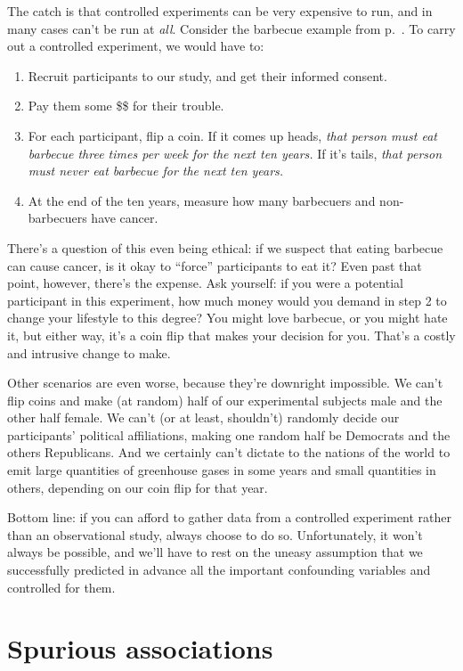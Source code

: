 The catch is that controlled experiments can be very expensive to run, and in
many cases can't be run at \textit{all}. Consider the barbecue example from
p.~\pageref{barbecue}. To carry out a controlled experiment, we would have to:

\begin{enumerate}[nosep]
\item Recruit participants to our study, and get their informed consent.
\item Pay them some \$\$ for their trouble.
\item For each participant, flip a coin. If it comes up heads, \textit{that
person must eat barbecue three times per week for the next ten years.} If it's
tails, \textit{that person must never eat barbecue for the next ten years.}
\item At the end of the ten years, measure how many barbecuers and
non-barbecuers have cancer.
\end{enumerate}

There's a question of this even being ethical: if we suspect that eating
barbecue can cause cancer, is it okay to ``force'' participants to eat it? Even
past that point, however, there's the expense. Ask yourself: if you were a
potential participant in this experiment, how much money would you demand in
step 2 to change your lifestyle to this degree? You might love barbecue, or you
might hate it, but either way, it's a coin flip that makes your decision for
you. That's a costly and intrusive change to make.

Other scenarios are even worse, because they're downright impossible. We can't
flip coins and make (at random) half of our experimental subjects male
and the other half female. We can't (or at least, shouldn't) randomly decide
our participants' political affiliations, making one random half be Democrats
and the others Republicans. And we certainly can't dictate to the nations of
the world to emit large quantities of greenhouse gases in some years and small
quantities in others, depending on our coin flip for that year.

Bottom line: if you can afford to gather data from a controlled experiment
rather than an observational study, always choose to do so. Unfortunately, it
won't always be possible, and we'll have to rest on the uneasy assumption that
we successfully predicted in advance all the important confounding variables
and controlled for them.

\section{Spurious associations}

